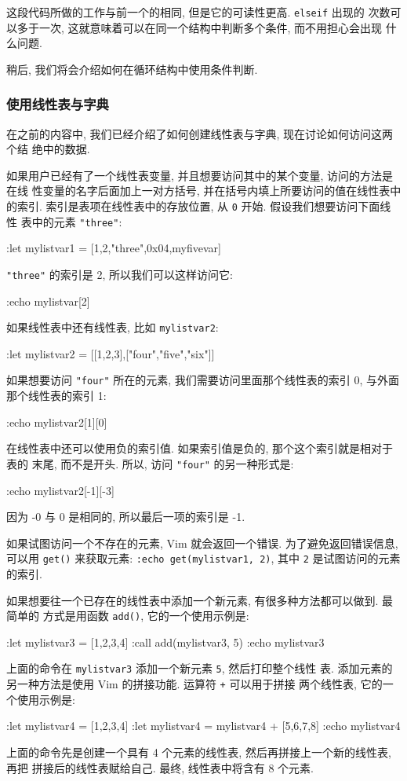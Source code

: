 这段代码所做的工作与前一个的相同, 但是它的可读性更高. \texttt{elseif} 出现的
次数可以多于一次, 这就意味着可以在同一个结构中判断多个条件, 而不用担心会出现
什么问题.

稍后, 我们将会介绍如何在循环结构中使用条件判断.

\subsubsection{使用线性表与字典}
\label{subsubsec:working_with_lists_and_dictionaries}

在之前的内容中, 我们已经介绍了如何创建线性表与字典, 现在讨论如何访问这两个结
绝中的数据.

如果用户已经有了一个线性表变量, 并且想要访问其中的某个变量, 访问的方法是在线
性变量的名字后面加上一对方括号, 并在括号内填上所要访问的值在线性表中的索引.
索引是表项在线性表中的存放位置, 从 \texttt{0} 开始. 假设我们想要访问下面线性
表中的元素 \texttt{"three"}:
\begin{vimcode}
:let mylistvar1 = [1,2,"three",0x04,myfivevar]
\end{vimcode}
\texttt{"three"} 的索引是 2, 所以我们可以这样访问它:
\begin{vimcode}
:echo mylistvar[2]
\end{vimcode}
如果线性表中还有线性表, 比如 \texttt{mylistvar2}:
\begin{vimcode}
    :let mylistvar2 = [[1,2,3],["four","five","six"]]
\end{vimcode}
如果想要访问 \texttt{"four"} 所在的元素, 我们需要访问里面那个线性表的索引 0,
与外面那个线性表的索引 1:
\begin{vimcode}
:echo mylistvar2[1][0]
\end{vimcode}

在线性表中还可以使用负的索引值. 如果索引值是负的, 那个这个索引就是相对于表的
末尾, 而不是开头. 所以, 访问 \texttt{"four"} 的另一种形式是:
\begin{vimcode}
:echo mylistvar2[-1][-3]
\end{vimcode}
因为 -0 与 0 是相同的, 所以最后一项的索引是 -1.

\begin{warning}
    如果试图访问一个不存在的元素, Vim 就会返回一个错误. 为了避免返回错误信息,
    可以用 \texttt{get()} 来获取元素: \texttt{:echo get(mylistvar1, 2)}, 其中
    \texttt{2} 是试图访问的元素的索引.
\end{warning}

如果想要往一个已存在的线性表中添加一个新元素, 有很多种方法都可以做到. 最简单的
方式是用函数 \texttt{add()}, 它的一个使用示例是:
\begin{vimcode}
:let mylistvar3 = [1,2,3,4]
:call add(mylistvar3, 5)
:echo mylistvar3
\end{vimcode}
上面的命令在 \texttt{mylistvar3} 添加一个新元素 \texttt{5}, 然后打印整个线性
表. 添加元素的另一种方法是使用 Vim 的拼接功能. 运算符 \texttt{+} 可以用于拼接
两个线性表, 它的一个使用示例是:
\begin{vimcode}
:let mylistvar4 = [1,2,3,4]
:let mylistvar4 = mylistvar4 + [5,6,7,8]
:echo mylistvar4
\end{vimcode}
上面的命令先是创建一个具有 4 个元素的线性表, 然后再拼接上一个新的线性表, 再把
拼接后的线性表赋给自己. 最终, 线性表中将含有 8 个元素.
